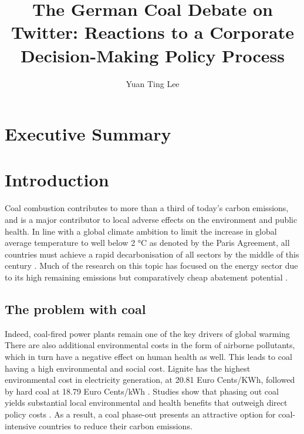 \documentclass[12pt,onecolumn,twoside]{layout}
\title{The German Coal Debate on Twitter: Reactions to a Corporate Decision-Making Policy Process}
\author[a,b]{Yuan Ting Lee}
\affil[a]{Hertie School, Friedrichstr. 180, Berlin 10117, Germany}
\affil[b]{Mercator Research Institute on Global Commons and Climate Change, Torgauer Str. 12 - 15, Berlin 10829, Germany}
\begin{document}
\onehalfspacing
\maketitle
\thispagestyle{firststyle}

\clearpage
{
	\hypersetup{linkcolor=black}
	\tableofcontents
}

\clearpage
\section{Executive Summary} \label{sec:summary}

\clearpage
\section{Introduction} \label{sec:introduction}
Coal combustion contributes to more than a third of today's carbon emissions, and is a major contributor to local adverse effects on the environment and public health.  In line with a global climate ambition to limit the increase in global average temperature to well below 2 \si{\degree}C as denoted by the Paris Agreement, all countries must achieve a rapid decarbonisation of all sectors by the middle of this century \cite{Figueres2017}. Much of the research on this topic has focused on the energy sector due to its high remaining emissions but comparatively cheap abatement potential \cite{Armstrong2016}. 

\subsection*{The problem with coal}
Indeed, coal-fired power plants remain one of the key drivers of global warming \cite{Edwards2019,Zhao2019} There are also  additional environmental costs in the form of airborne pollutants, which in turn have a negative effect on human health as well. This leads to coal having a high environmental and social cost. Lignite has the highest environmental cost in electricity generation, at 20.81 Euro Cents/KWh, followed by hard coal at 18.79 Euro Cents/kWh \cite{Oei2020}. Studies show that phasing out coal yields substantial local environmental and health benefits that outweigh direct policy costs \cite{Rauner2020}. As a result, a coal phase-out presents an attractive option for coal-intensive countries to reduce their carbon emissions.
\end{document}
